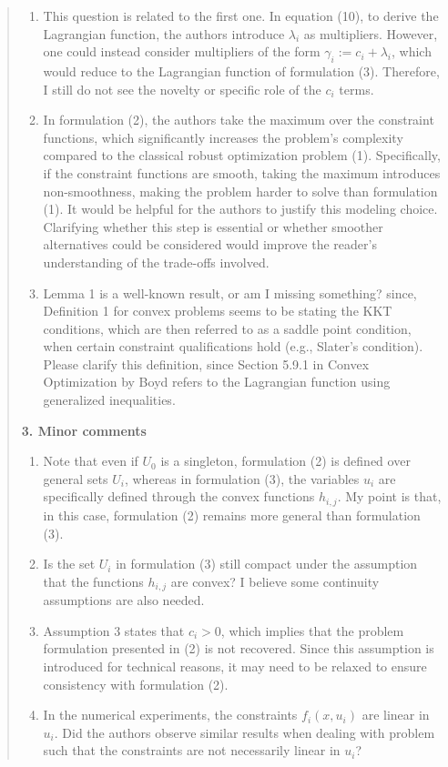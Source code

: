 \documentclass[journal,twoside,web]{ieeecolor}
\begin{document}
\begin{quote}
\begin{enumerate}
\item This question is related to the first one. In equation (10), to derive the Lagrangian function, the authors introduce $\lambda_i$ as multipliers. However, one could instead consider multipliers of the form $\gamma_i := c_i + \lambda_i$, which would reduce to the Lagrangian function of formulation (3). Therefore, I still do not see the novelty or specific role of the $c_i$ terms.

\item In formulation (2), the authors take the maximum over the constraint functions, which significantly increases the problem's complexity compared to the classical robust optimization problem (1). Specifically, if the constraint functions are smooth, taking the maximum introduces non-smoothness, making the problem harder to solve than formulation (1). It would be helpful for the authors to justify this modeling choice. Clarifying whether this step is essential or whether smoother alternatives could be considered would improve the reader's understanding of the trade-offs involved.

\item Lemma 1 is a well-known result, or am I missing something? since, Definition 1 for convex problems seems to be stating the KKT conditions, which are then referred to as a saddle point condition, when certain constraint qualifications hold (e.g., Slater's condition). Please clarify this definition, since Section 5.9.1 in Convex Optimization by Boyd refers to the Lagrangian function using generalized inequalities.
\end{enumerate}

\textbf{3. Minor comments}

\begin{enumerate}[resume]
\item Note that even if $U_0$ is a singleton, formulation (2) is defined over general sets $U_i$, whereas in formulation (3), the variables $u_i$ are specifically defined through the convex functions $h_{i,j}$. My point is that, in this case, formulation (2) remains more general than formulation (3).

\item Is the set $U_i$ in formulation (3) still compact under the assumption that the functions $h_{i,j}$ are convex? I believe some continuity assumptions are also needed.

\item Assumption 3 states that $c_i > 0$, which implies that the problem formulation presented in (2) is not recovered. Since this assumption is introduced for technical reasons, it may need to be relaxed to ensure consistency with formulation (2).

\item In the numerical experiments, the constraints $f_i(x, u_i)$ are linear in $u_i$. Did the authors observe similar results when dealing with problem such that the constraints are not necessarily linear in $u_i$?
\end{enumerate}
\end{quote}
\end{document}
